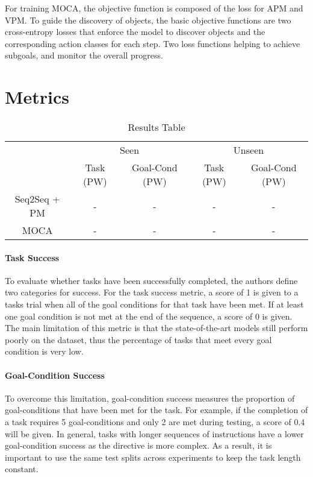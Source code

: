 \documentclass[11pt,a4paper]{article}
\begin{document}
For training MOCA, the objective function is composed of the loss for APM and VPM. To guide the discovery of objects, the basic objective functions are two cross-entropy losses that enforce the model to discover objects and the corresponding action classes for each step. Two loss functions helping to achieve subgoals, and monitor the overall progress.

\section{Metrics}

\begin{table*}[]
    \centering
    \begin{tabular}{c|c|c|c|c}
    \toprule
    & \multicolumn{2}{c|}{Seen} & \multicolumn{2}{c}{Unseen} \\
    & Task (PW) & Goal-Cond (PW) & Task (PW) & Goal-Cond (PW) \\
    \midrule
    Seq2Seq + PM & - & - & - & - \\ 
    MOCA & - & - & - & - \\
    \bottomrule
    \end{tabular}
    \caption{Results Table}
    \label{tab:my_label}
\end{table*}

\paragraph{Task Success} To evaluate whether tasks have been successfully completed, the authors define two categories for success. For the task success metric, a score of 1 is given to a tasks trial when all of the goal conditions for that task have been met. If at least one goal condition is not met at the end of the sequence, a score of 0 is given. The main limitation of this metric is that the state-of-the-art models still perform poorly on the dataset, thus the percentage of tasks that meet every goal condition is very low.

\paragraph{Goal-Condition Success} To overcome this limitation, goal-condition success measures the proportion of goal-conditions that have been met for the task. For example, if the completion of a task requires 5 goal-conditions and only 2 are met during testing, a score of 0.4 will be given. In general, tasks with longer sequences of instructions have a lower goal-condition success as the directive is more complex. As a result, it is important to use the same test splits across experiments to keep the task length constant.
\end{document}
